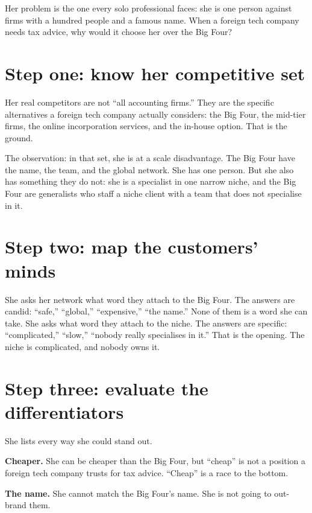 \documentclass[10pt,twoside,openany]{memoir}
\newcommand{\needspacehead}{\needspace{4\baselineskip}}
\let\oldsection\section
\renewcommand{\section}{\needspacehead\oldsection}
\begin{document}
{Her problem is the one every solo professional faces: she is one person
against firms with a hundred people and a famous name. When a foreign
tech company needs tax advice, why would it choose her over the Big
Four?

\section{Step one: know her competitive
set}\label{step-one-know-her-competitive-set-1}

Her real competitors are not ``all accounting firms.'' They are the
specific alternatives a foreign tech company actually considers: the Big
Four, the mid-tier firms, the online incorporation services, and the
in-house option. That is the ground.

The observation: in that set, she is at a scale disadvantage. The Big
Four have the name, the team, and the global network. She has one
person. But she also has something they do not: she is a specialist in
one narrow niche, and the Big Four are generalists who staff a niche
client with a team that does not specialise in it.

\section{Step two: map the customers'
minds}\label{step-two-map-the-customers-minds-3}

She asks her network what word they attach to the Big Four. The answers
are candid: ``safe,'' ``global,'' ``expensive,'' ``the name.'' None of
them is a word she can take. She asks what word they attach to the
niche. The answers are specific: ``complicated,'' ``slow,'' ``nobody
really specialises in it.'' That is the opening. The niche is
complicated, and nobody owns it.

\section{Step three: evaluate the
differentiators}\label{step-three-evaluate-the-differentiators-3}

She lists every way she could stand out.

\textbf{Cheaper.} She can be cheaper than the Big Four, but ``cheap'' is
not a position a foreign tech company trusts for tax advice. ``Cheap''
is a race to the bottom.

\textbf{The name.} She cannot match the Big Four's name. She is not
going to out-brand them.

}
\end{document}
